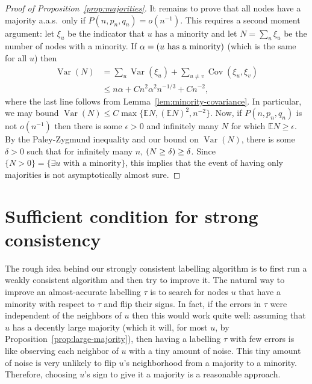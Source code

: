 \documentclass[EJP,final]{ejpecp}
\newcommand{\E}{\mathbb{E}}
\newcommand{\1}[1]{\mathbbm{1}_{\{#1\}}}
\let\Pr\relax
\DeclareMathOperator{\Pr}{Pr}
\DeclareMathOperator{\Var}{Var}
\DeclareMathOperator{\Cov}{Cov}
\begin{document}
\begin{proof}[Proof of Proposition~\ref{prop:majorities}]
  It remains to prove that all nodes have a majority a.a.s.\ only if
  $P(n, p_n, q_n) = o(n^{-1})$. This requires a second moment argument:
  let $\xi_u$ be the indicator that $u$ has a minority
  and let $N = \sum_u \xi_u$ be the number of nodes with a minority. If
  $\alpha = \Pr(\text{$u$ has a minority})$ (which is the same for all $u$) then
  \begin{align*}
   \Var(N)
   &= \sum_u \Var(\xi_u) + \sum_{u \ne v} \Cov(\xi_u, \xi_v) \\
   &\le n \alpha + C n^2 \alpha^2 n^{-1/3} + C n^{-2},
  \end{align*}
  where the last line follows from Lemma~\ref{lem:minority-covariance}.
  In particular, we may bound $\Var(N) \le C \max\{\E N, (\E N)^2, n^{-2}\}$. Now, if
  $P(n, p_n, q_n)$ is not $o(n^{-1})$ then there is some $\epsilon > 0$
  and infinitely many $N$ for which $\E N \ge \epsilon$. By
  the Paley-Zygmund inequality and our bound on $\Var(N)$,
  there is some $\delta > 0$ such that
  for infinitely many $n$, $\Pr(N \ge \delta) \ge \delta$.
  Since $\{N > 0\} = \{\exists u \text{ with a minority}\}$, this implies that the event of having
  only majorities is not asymptotically almost sure.
\end{proof}


\section{Sufficient condition for strong consistency}\label{sec:sufficient}

The rough idea behind our strongly consistent labelling algorithm is to
first run a weakly consistent algorithm and then try to improve it.
The natural way to improve an almost-accurate labelling $\tau$
is to search for nodes $u$ that have a minority with respect to $\tau$
and flip their signs. In fact, if the errors in $\tau$ were independent
of the neighbors of $u$ then this would work quite well:
assuming that $u$ has a decently large majority (which it will, for
most $u$, by Proposition~\ref{prop:large-majority}), then having a
labelling $\tau$ with few errors is like observing each neighbor of $u$
with a tiny amount of noise. This tiny amount of noise is very unlikely
to flip $u$'s neighborhood from a majority to a minority. Therefore,
choosing $u$'s sign to give it a majority is a reasonable approach.
\end{document}
